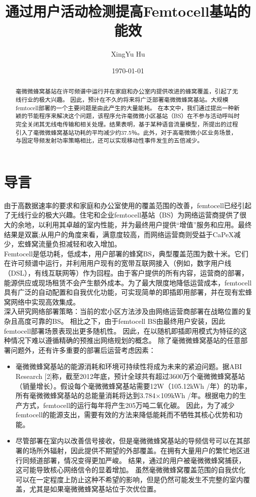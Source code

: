 \documentclass{article}
\author{XingYu Hu}
\title{通过用户活动检测提高Femtocell基站的能效}
\date{\today}
\begin{document}
\maketitle

\begin{abstract}
    毫微微蜂窝基站在许可频谱中运行并在家庭和办公室内提供改进的蜂窝覆盖，引起了无线行业的极大兴趣。
    因此，预计在不久的将来将广泛部署毫微微蜂窝基站。大规模femtocell部署的一个主要问题是由此产生的大量能耗。
    在本文中，我们通过提出一种新颖的节能程序来解决这个问题，该程序允许毫微微小区基站（BS）在不参与活动呼叫时完全关闭其无线电传输和相关处理。结果表明，基于某种语音流量模型，所提出的过程引入了毫微微蜂窝基站功耗的平均减少约37.5％。此外，对于高毫微微小区业务场景，与固定导频发射功率策略相比，还可以实现移动性事件发生的五倍减少。
\end{abstract}

\section{导言}
由于高数据速率的要求和家庭和办公室使用的覆盖范围的改善，femtocell已经引起了无线行业的极大兴趣。住宅和企业femtocell基站（BS）为网络运营商提供了很大的余地，以利用其卓越的室内性能，并为最终用户提供“增值”服务和应用。最终结果是双赢;从用户的角度来看，满意度较高，而网络运营商则受益于CaPeX减少，宏蜂窝流量负担减轻和收入增加。\\

Femtocell是低功耗，低成本，用户部署的蜂窝BS，典型覆盖范围为数十米。它们在许可频谱中运行，并利用用户现有的宽带互联网接入（例如，数字用户线（DSL），有线互联网等）作为回程。由于客户提供的所有内容，运营商的部署，能源供应或现场租赁不会产生额外成本。为了最大限度地降低运营成本，femtocell具有广泛的自动配置和自我优化功能，可实现简单的即插即用部署，并在现有宏蜂窝网络中实现高效集成。\\

深入研究网络部署策略：当前的宏小区方法涉及由网络运营商部署在战略位置的复杂且高度可靠的BS。
相比之下，由于femtocell BS由最终用户安装，因此femtocell部署场景表现出更多随机性。
因此，在以随机即插即用模式为特征的这种情况下难以遵循精确的预推出网络规划的概念。
除了毫微微蜂窝基站的任意部署问题外，还有许多重要的部署后运营考虑因素：
\begin{itemize}
    \item 毫微微蜂窝基站的能源消耗和环境可持续性将成为未来的紧迫问题。据ABI Research [2]称，截至2012年底，预计全球共有超过3600万个毫微微蜂窝基站（销量增长）。假设每个毫微微蜂窝基站需要12W（105.12kWh /年）的功率，所有毫微微蜂窝基站的总能量消耗将达到3.784×109kWh /年。根据电力的生产方式，femtocell的运行每年将产生205万吨二氧化碳。
    因此，为了减少femtocell的能源支出，需要有效的方法来降低能耗而不牺牲其核心优势和功能。
    \item 尽管部署在室内以改善信号接收，但是毫微微蜂窝基站的导频信号可以在其部署的场所外辐射，因此提供不期望的外部覆盖。在拥有大量用户的繁忙地区进行同频道部署，情况变得更加严峻。
    结果，通过的用户被毫微微蜂窝捕获，这可能导致核心网络信令的显着增加。
    虽然毫微微蜂窝覆盖范围的自我优化可以在一定程度上防止这种不希望的影响，但是仍然可能发生不完整的室内覆盖，尤其是如果毫微微蜂窝基站位于次优位置。
\end{itemize}
\end{document}
